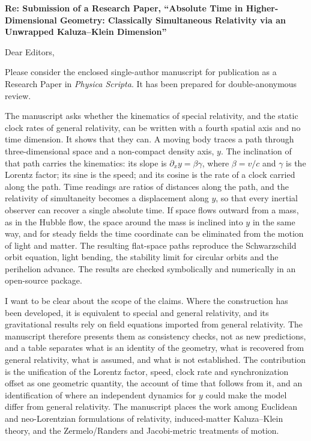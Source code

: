 \documentclass[10pt]{article}
\begin{document}
\vspace{0.2em}
{\raggedright{} \textbf{Re: Submission of a Research Paper, ``Absolute Time in Higher-Dimensional Geometry: Classically Simultaneous Relativity via an Unwrapped Kaluza--Klein Dimension''}

Dear Editors,

Please consider the enclosed single-author manuscript for publication as a Research Paper in \textit{Physica Scripta}. It has been prepared for double-anonymous review.

The manuscript asks whether the kinematics of special relativity, and the static clock rates of general relativity, can be written with a fourth spatial axis and no time dimension. It shows that they can. A moving body traces a path through three-dimensional space and a non-compact density axis, $y$. The inclination of that path carries the kinematics: its slope is $\partial_x y=\beta\gamma$, where $\beta=v/c$ and $\gamma$ is the Lorentz factor; its sine is the speed; and its cosine is the rate of a clock carried along the path. Time readings are ratios of distances along the path, and the relativity of simultaneity becomes a displacement along $y$, so that every inertial observer can recover a single absolute time. If space flows outward from a mass, as in the Hubble flow, the space around the mass is inclined into $y$ in the same way, and for steady fields the time coordinate can be eliminated from the motion of light and matter. The resulting flat-space paths reproduce the Schwarzschild orbit equation, light bending, the stability limit for circular orbits and the perihelion advance. The results are checked symbolically and numerically in an open-source package.

I want to be clear about the scope of the claims. Where the construction has been developed, it is equivalent to special and general relativity, and its gravitational results rely on field equations imported from general relativity. The manuscript therefore presents them as consistency checks, not as new predictions, and a table separates what is an identity of the geometry, what is recovered from general relativity, what is assumed, and what is not established. The contribution is the unification of the Lorentz factor, speed, clock rate and synchronization offset as one geometric quantity, the account of time that follows from it, and an identification of where an independent dynamics for $y$ could make the model differ from general relativity. The manuscript places the work among Euclidean and neo-Lorentzian formulations of relativity, induced-matter Kaluza--Klein theory, and the Zermelo/Randers and Jacobi-metric treatments of motion.

}
\end{document}
